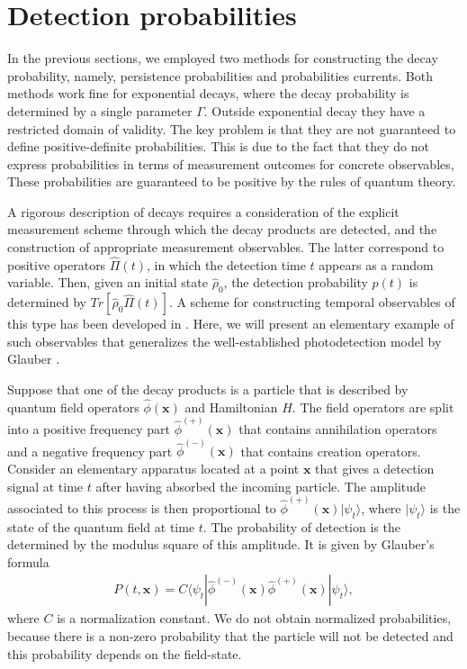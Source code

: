 \documentclass[12pt]{article}
\numberwithin{equation}{section}
\begin{document}
\section{Detection probabilities}
In the previous sections, we employed two methods for constructing the decay probability, namely, persistence probabilities and probabilities currents. Both methods work fine for exponential decays, where the decay probability is determined by a single parameter $\Gamma$. Outside exponential decay they have a restricted domain of validity. The key problem is that they are not guaranteed to define positive-definite probabilities.  This is due to the fact that they do not express probabilities in terms of measurement outcomes for concrete observables, These probabilities are  guaranteed to be positive by the rules of quantum theory.

A rigorous  description of decays requires a consideration of the explicit measurement scheme through which the decay products are detected, and the construction of appropriate measurement observables. The latter correspond to
  positive operators $\hat{\Pi}(t)$, in which the detection time $t$ appears as a random variable. Then, given an initial state $\hat{\rho}_0$, the detection probability $p(t)$ is determined by $Tr\left[\hat{\rho}_0 \hat{\Pi}(t)\right]$.  A scheme for constructing temporal observables of this type has been developed in \cite{AnSav}. Here, we will present an elementary example of such observables that generalizes the well-established photodetection model by Glauber \cite{Glauber}.


Suppose that one of the decay products is a particle that is described by  quantum field  operators $\hat{\phi}({\pmb x})$ and Hamiltonian $\hat{H}$. The field operators are split into a positive frequency part $\hat{\phi}^{(+)}({\pmb x})$ that contains annihilation operators and a negative frequency part $\hat{\phi}^{(-)}({\pmb x})$ that contains creation operators. Consider an elementary apparatus located at a point ${\pmb x}$ that gives a detection signal at time $t$ after having absorbed the incoming particle. The amplitude associated to this process is then proportional to $\hat{\phi}^{(+)}({\pmb x})|\psi_t\rangle$, where  $|\psi_t \rangle$  is the state of the quantum field at time $t$. The probability of detection is the determined by the modulus square of this amplitude. It is given by
  Glauber's formula
\begin{eqnarray}
P(t, {\pmb x})  = C  \langle \psi_t| \hat{\phi}^{(-)}({\pmb x})\hat{\phi}^{(+)}({\pmb x})|\psi_t\rangle, \label{Glauber}
\end{eqnarray}
where   $C$ is a normalization constant.  We do not obtain normalized probabilities, because there is a non-zero probability that the particle will not be detected and this probability depends on the field-state.
\end{document}
